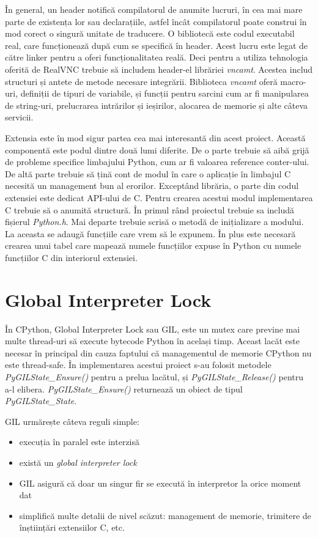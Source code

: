 În general, un header notifică compilatorul de anumite lucruri, în cea mai mare parte de existența lor sau declarațiile, astfel încât compilatorul poate construi în mod corect o singură unitate de traducere. O bibliotecă este codul executabil real, care funcționează după cum se specifică în header. Acest lucru este legat de către linker pentru a oferi funcționalitatea reală. Deci pentru a utiliza tehnologia oferită de RealVNC trebuie să includem header-el librăriei \textit{vncamt}. Acestea includ structuri și antete de metode necesare integrării. Biblioteca \textit{vncamt} oferă macro-uri, definiții de tipuri de variabile, și funcții pentru sarcini cum ar fi manipularea de string-uri, prelucrarea intrărilor și ieșirilor, alocarea de memorie și alte câteva servicii.

Extensia este în mod sigur partea cea mai interesantă din acest proiect. Această componentă este podul dintre două lumi diferite. De o parte trebuie să aibă grijă de probleme specifice limbajului Python, cum ar fi valoarea reference conter-ului. De altă parte trebuie să țină cont de modul în care o aplicație în limbajul C necesită un management bun al erorilor. Exceptând librăria, o parte din codul extensiei este dedicat API-ului de C. Pentru crearea acestui modul implementarea C trebuie să o anumită structură. În primul rând proiectul trebuie sa includă fișierul \textit{Python.h}. Mai departe trebuie scrisă o metodă de inițializare a modului. La aceasta se adaugă funcțiile care vrem să le expunem. În plus este necesară crearea unui tabel care mapează numele funcțiilor expuse în Python cu numele funcțiilor C din interiorul extensiei.


\section{Global Interpreter Lock}

În CPython, Global Interpreter Lock sau GIL, este un mutex care previne mai multe thread-uri să execute bytecode Python în același timp. Aceast lacăt este necesar în principal din cauza faptului că managementul de memorie  CPython nu este thread-safe.
În implementarea acestui proiect s-au folosit metodele \textit{PyGILState\_Ensure()} pentru a prelua lacătul, și \textit{PyGILState\_Release()} pentru a-l elibera. \textit{PyGILState\_Ensure()} returnează un obiect de tipul \textit{PyGILState\_State}.
 
GIL urmărește câteva reguli simple:
\begin{itemize}
  \item execuția în paralel este interzisă
  \item există un \textit{global interpreter lock}
  \item GIL asigură că doar un singur fir se execută în
interpretor la orice moment dat
  \item simplifică multe detalii de nivel scăzut: management de memorie, trimitere de înștiințări extensiilor C, etc.
\end{itemize}

